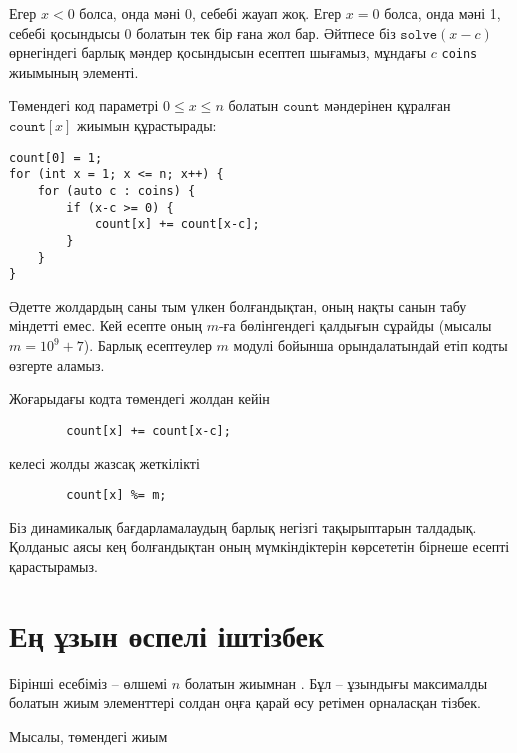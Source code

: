 Егер $x<0$ болса, онда мәні 0, себебі жауап жоқ.
Егер $x=0$ болса, онда мәні 1, себебі қосындысы 0 
болатын тек бір ғана жол бар.
Әйтпесе біз $\texttt{solve}(x-c)$ өрнегіндегі
барлық мәндер қосындысын есептеп шығамыз, 
мұндағы $c$ \texttt{coins} жиымының элементі. 

Төмендегі код параметрі $0 \le x \le n$ болатын
$\texttt{count}$ мәндерінен
құралған $\texttt{count}[x]$ жиымын құрастырады:

\begin{lstlisting}
count[0] = 1;
for (int x = 1; x <= n; x++) {
    for (auto c : coins) {
        if (x-c >= 0) {
            count[x] += count[x-c];
        }
    }
}
\end{lstlisting}

Әдетте жолдардың саны тым үлкен болғандықтан, 
оның нақты санын табу міндетті емес. Кей
есепте оның $m$-ға бөлінгендегі қалдығын сұрайды 
(мысалы $m=10^9+7$). Барлық есептеулер $m$ модулі бойынша 
орындалатындай етіп кодты өзгерте аламыз.

Жоғарыдағы кодта төмендегі жолдан кейін
\begin{lstlisting}
        count[x] += count[x-c];
\end{lstlisting}
келесі жолды жазсақ жеткілікті
\begin{lstlisting}
        count[x] %= m;
\end{lstlisting}

Біз динамикалық бағдарламалаудың 
барлық негізгі тақырыптарын талдадық.
Қолданыс аясы кең болғандықтан оның мүмкіндіктерін
көрсететін бірнеше есепті қарастырамыз.

\section{Ең ұзын өспелі іштізбек}


Бірінші есебіміз -- өлшемі $n$ болатын
жиымнан
.
Бұл -- ұзындығы максималды болатын жиым 
элементтері солдан оңға қарай өсу ретімен 
орналасқан тізбек.

Мысалы, төмендегі жиым 

